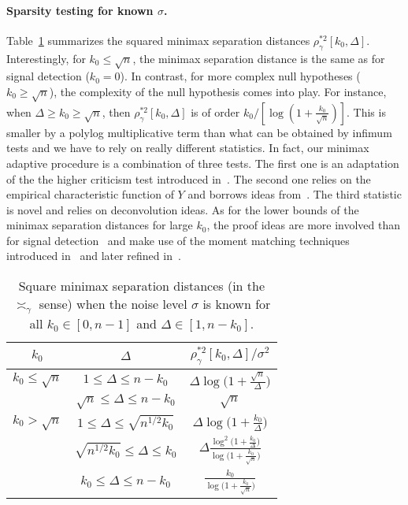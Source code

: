 \documentclass[twoside,11pt]{article}
\newcommand{\<}{\langle}
\renewcommand{\>}{\rangle}
\begin{document}
\paragraph{Sparsity testing for known $\sigma$.} Table~\ref{Tab:KV} summarizes the squared minimax separation distances $\rho^{*2}_\gamma[k_0,\Delta]$. Interestingly, for $k_0\leq \sqrt{n}$, the minimax separation distance is the same as for signal detection ($k_0=0$). In contrast, for more complex null hypotheses ($k_0\geq \sqrt{n}$), the complexity of the null hypothesis comes into play. For instance, when $\Delta\geq k_0 \geq \sqrt{n}$, then  $\rho^{*2}_\gamma [k_0,\Delta]$ is of order $k_0/[\log(1+\tfrac{k_0}{\sqrt{n}})]$. This is smaller by a polylog multiplicative term than what can be obtained by infimum tests and we have to rely on really different statistics. In fact, our minimax adaptive procedure is a combination of three tests. The first one is an adaptation of the the higher criticism test introduced in~\cite{jin2004}. The second one relies on the empirical characteristic function of $Y$ and borrows ideas from~\cite{MR2420411}. The third statistic is novel and relies on deconvolution ideas. As for the lower bounds of the minimax separation distances for large $k_0$, the proof ideas are more involved than for signal detection~\cite{baraud02} and make use of the moment matching techniques introduced in~\cite{lepski1999estimation} and later refined in~\cite{Juditsky_convexity,cailow2011}.


 \begin{table}
\caption{Square minimax separation distances (in the $\asymp_{\gamma}$ sense) when the noise level $\sigma$ is known for all $k_0\in [0,n-1]$ and $\Delta\in [1,n-k_0]$.}
\label{Tab:KV}
 \begin{center}
 \begin{tabular}{c|c|c}
 $k_0$& $\Delta$ &  $\rho^{*2}_\gamma[k_0,\Delta]/\sigma^2$\\ \hline \hline
$k_0 \leq \sqrt{n}$ & $1\leq \Delta \leq n-k_0$ & $\Delta \log\Big(1+\frac{\sqrt{n}}{\Delta}\Big) $ \\ 
& $ \sqrt{n} \leq \Delta \leq n-k_0$  &$\sqrt{n}$ \\ 
\hline
$k_0 > \sqrt{n}$ &  $1 \leq \Delta \leq \sqrt{n^{1/2} k_0}$
&  $\Delta \log\Big(1+\frac{k_0}{\Delta}\Big)$\\
 & 
$\sqrt{n^{1/2} k_0}\leq \Delta \leq k_0$ & $ \Delta \frac{\log^2\big(1+\tfrac{k_0}{\Delta}\big)}{\log\big(1+\tfrac{k_0}{\sqrt{n}}\big)}$\\
 &  $k_0 \leq \Delta \leq n-k_0$ & $ \frac{k_0}{\log\big(1+\tfrac{k_0}{\sqrt{n}}\big)}$\\ 
 \end{tabular}
 \end{center}
\end{table}
\end{document}
